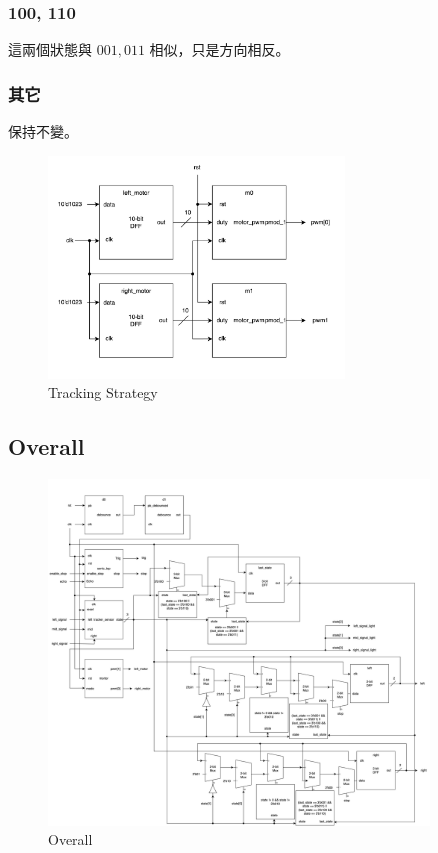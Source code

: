 \documentclass[10.5pt,compsoc,UTF8]{CjC}
\theoremstyle{mystyle}
\begin{document}
\subsubsection*{100, 110}
這兩個狀態與 $001, 011$ 相似，只是方向相反。

\subsubsection*{其它}
保持不變。

\begin{figure}[!h]
  \centering
  \includegraphics[width=0.7\textwidth]{./img/car-2.png}
  \caption{Tracking Strategy}
  \label{fig:tracking}
\end{figure}

\newpage

\subsection{Overall}

\begin{figure}[h!]
  \centering
  \includegraphics[width=0.9\textwidth]{./img/car-3.png}
  \caption{Overall}
  \label{fig:overall}
\end{figure}
\end{document}
